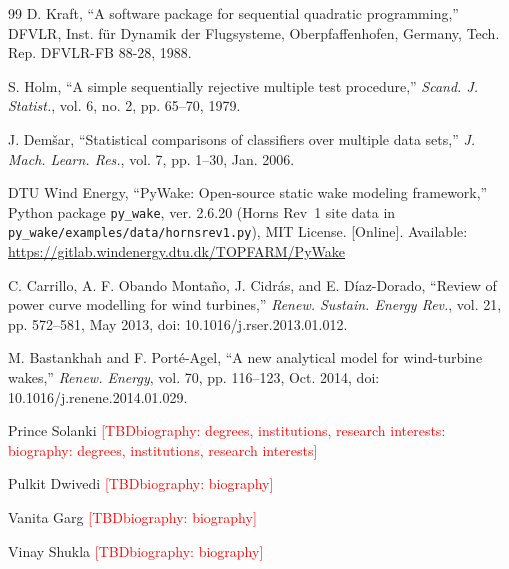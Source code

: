 \documentclass[journal,twoside]{IEEEtran}
\newcommand{\TBD}[1]{\textcolor{red}{[TBD\ifx\relax#1\relax\else: #1\fi]}}
\begin{document}
\begin{thebibliography}{99}
D. Kraft, ``A software package for sequential quadratic programming,'' DFVLR, Inst. f\"ur Dynamik der Flugsysteme, Oberpfaffenhofen, Germany, Tech. Rep. DFVLR-FB 88-28, 1988.

S. Holm, ``A simple sequentially rejective multiple test procedure,'' \textit{Scand. J. Statist.}, vol. 6, no. 2, pp. 65--70, 1979.

J. Dem\v{s}ar, ``Statistical comparisons of classifiers over multiple data sets,'' \textit{J. Mach. Learn. Res.}, vol. 7, pp. 1--30, Jan. 2006.

DTU Wind Energy, ``PyWake: Open-source static wake modeling framework,'' Python package \texttt{py\_wake}, ver. 2.6.20 (Horns Rev~1 site data in \texttt{py\_wake/examples/data/hornsrev1.py}), MIT License. [Online]. Available: \url{https://gitlab.windenergy.dtu.dk/TOPFARM/PyWake}

C. Carrillo, A. F. Obando Monta\~no, J. Cidr\'as, and E. D\'iaz-Dorado, ``Review of power curve modelling for wind turbines,'' \textit{Renew. Sustain. Energy Rev.}, vol. 21, pp. 572--581, May 2013, doi: 10.1016/j.rser.2013.01.012.

M. Bastankhah and F. Port\'e-Agel, ``A new analytical model for wind-turbine wakes,'' \textit{Renew. Energy}, vol. 70, pp. 116--123, Oct. 2014, doi: 10.1016/j.renene.2014.01.029.

\end{thebibliography}

\begin{IEEEbiographynophoto}{Prince Solanki}
\TBD{biography: degrees, institutions, research interests}
\end{IEEEbiographynophoto}

\begin{IEEEbiographynophoto}{Pulkit Dwivedi}
\TBD{biography}
\end{IEEEbiographynophoto}

\begin{IEEEbiographynophoto}{Vanita Garg}
\TBD{biography}
\end{IEEEbiographynophoto}

\begin{IEEEbiographynophoto}{Vinay Shukla}
\TBD{biography}
\end{IEEEbiographynophoto}
\end{document}
